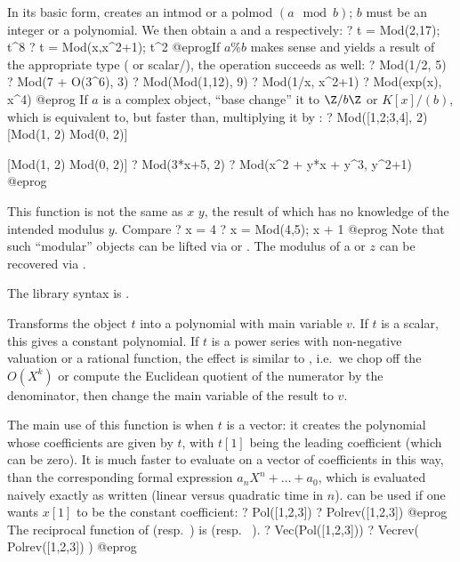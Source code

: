 \label{se:Mod}
In its basic form, creates an intmod or a polmod $(a \mod b)$; $b$ must
be an integer or a polynomial. We then obtain a  and a
 respectively:
\bprog
? t = Mod(2,17); t^8
? t = Mod(x,x^2+1); t^2
@eprog\noindent If $a \% b$ makes sense and yields a result of the
appropriate type ( or scalar/), the operation succeeds as
well:
\bprog
? Mod(1/2, 5)
? Mod(7 + O(3^6), 3)
? Mod(Mod(1,12), 9)
? Mod(1/x, x^2+1)
? Mod(exp(x), x^4)
@eprog
If $a$ is a complex object, ``base change'' it to $\Z/b\Z$ or $K[x]/(b)$,
which is equivalent to, but faster than, multiplying it by :
\bprog
? Mod([1,2;3,4], 2)
[Mod(1, 2) Mod(0, 2)]

[Mod(1, 2) Mod(0, 2)]
? Mod(3*x+5, 2)
? Mod(x^2 + y*x + y^3, y^2+1)
@eprog

This function is not the same as $x$ \kbd{\%} $y$, the result of which
has no knowledge of the intended modulus $y$. Compare
\bprog
? x = 4 %
? x = Mod(4,5); x + 1
@eprog Note that such ``modular'' objects can be lifted via  or
. The modulus of a  or  $z$ can
be recovered via .

The library syntax is .

\label{se:Pol}
Transforms the object $t$ into a polynomial with main variable $v$. If $t$
is a scalar, this gives a constant polynomial. If $t$ is a power series with
non-negative valuation or a rational function, the effect is similar to
, i.e.~we chop off the $O(X^k)$ or compute the Euclidean
quotient of the numerator by the denominator, then change the main variable
of the result to $v$.

The main use of this function is when $t$ is a vector: it creates the
polynomial whose coefficients are given by $t$, with $t[1]$ being the leading
coefficient (which can be zero). It is much faster to evaluate
 on a vector of coefficients in this way, than the corresponding
formal expression $a_n X^n + \dots + a_0$, which is evaluated naively exactly
as written (linear versus quadratic time in $n$).  can be used if
one wants $x[1]$ to be the constant coefficient:
\bprog
? Pol([1,2,3])
? Polrev([1,2,3])
@eprog\noindent
The reciprocal function of  (resp.~) is  (resp.~
).
\bprog
? Vec(Pol([1,2,3]))
? Vecrev( Polrev([1,2,3]) )
@eprog\noindent

